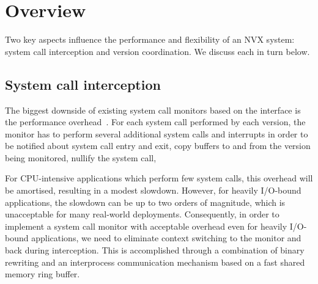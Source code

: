 \section{Overview}
\label{sec:overview}

Two key aspects influence the performance and flexibility of an NVX
system: system call interception and version coordination.  We discuss
each in turn below.

\subsection{System call interception}
\label{sec:interception}


The biggest downside of existing system call monitors based on the
\ptrace interface is the performance
overhead~\cite{cox2006,orchestra09,tachyon12,mx}.  For each system
call performed by each version, the monitor has to perform several
additional system calls and interrupts in order to be notified about
system call entry and exit, copy buffers to and from the version being
monitored, nullify the system call, \etc

For CPU-intensive applications which perform few system calls,
this overhead will be amortised, resulting in a modest
slowdown. However, for heavily I/O-bound applications,
the slowdown can be up to two orders of magnitude, which is
unacceptable for many real-world deployments.
%
Consequently, in order to implement a system call monitor with
acceptable overhead even for heavily I/O-bound applications, we need
to eliminate context switching to the monitor and back during
interception.  This is accomplished through a combination of binary
rewriting and an interprocess communication mechanism based on a
fast shared memory ring buffer.


